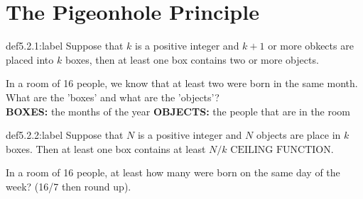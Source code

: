 \section{The Pigeonhole Principle}

\begin{definition}{def5.2.1:label}
    Suppose that $k$ is a positive integer and $k+1$ or more obkects are placed into $k$ boxes, then at least one box contains two or more objects.
\end{definition}

\begin{problem}
    In a room of 16 people, we know that at least two were born in the same month. What are the 'boxes' and what are the 'objects'?\\

    \textbf{BOXES:} the months of the year
    \textbf{OBJECTS:} the people that are in the room
\end{problem}


\begin{definition}{def5.2.2:label}
    Suppose that $N$ is a positive integer and $N$ objects are place in $k$ boxes. Then at least one box contains at least $N/k \text{ CEILING FUNCTION}$.
\end{definition}


\begin{problem}
    In a room of 16 people, at least how many were born on the same day of the week? (16/7 then round up).
\end{problem}
